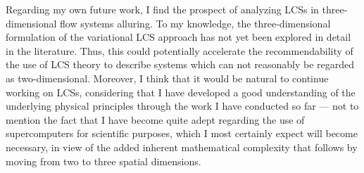 Regarding my own future work, I find the prospect of analyzing
LCSs in three-dimensional flow systems alluring. To my knowledge, the
three-dimensional formulation of the variational LCS approach has not yet
been explored in detail in the literature. Thus, this could potentially
accelerate the recommendability of the use of LCS theory to describe systems
which can not reasonably be regarded as two-dimensional. Moreover, I think
that it would be natural to continue working on LCSs, considering that I have
developed a good understanding of the underlying physical principles through the
work I have conducted so far --- not to mention the fact that I have become
quite adept regarding the use of supercomputers for scientific purposes, which
I most certainly expect will become necessary, in view of the added inherent
mathematical complexity that follows by moving from two to three spatial
dimensions.
